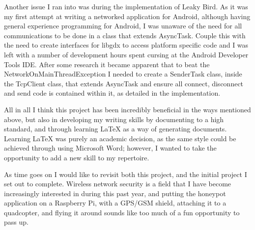 Another issue I ran into was during the implementation of Leaky Bird. As it was my first attempt at writing a networked application for Android, although having general experience programming for Android, I was unaware of the need for all communications to be done in a class that extends AsyncTask. Couple this with the need to create interfaces for libgdx to access platform specific code and I was left with a number of development hours spent cursing at the Android Developer Tools IDE. After some research it became apparent that to beat the NetworkOnMainThreadException I needed to create a SenderTask class, inside the TcpClient class, that extends AsyncTask and ensure all connect, disconnect and send code is contained within it, as detailed in the implementation.

All in all I think this project has been incredibly beneficial in the ways mentioned above, but also in developing my writing skills by documenting to a high standard, and through learning LaTeX as a way of generating documents. Learning LaTeX was purely an academic decision, as the same style could be achieved through using Microsoft Word; however, I wanted to take the opportunity to add a new skill to my repertoire. 

As time goes on I would like to revisit both this project, and the initial project I set out to complete. Wireless network security is a field that I have become increasingly interested in during this past year, and putting the honeypot application on a Raspberry Pi, with a GPS/GSM shield, attaching it to a quadcopter, and flying it around sounds like too much of a fun opportunity to pass up.


\clearpage